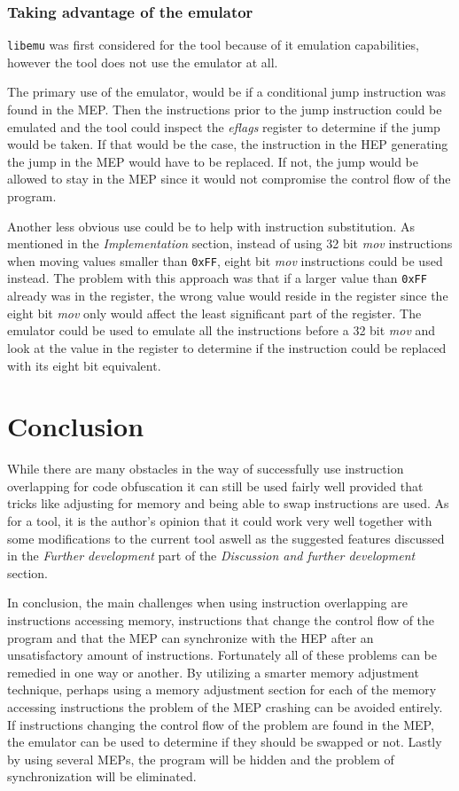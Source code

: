 \documentclass[11pt,twoside]{eitExjobb}
\begin{document}
\subsection{Taking advantage of the emulator}
\texttt{libemu} was first considered for the tool because of it emulation capabilities, however the tool does not use the emulator at all. 

The primary use of the emulator, would be if a conditional jump instruction was found in the MEP. Then the instructions prior to the jump instruction could be emulated and the tool could inspect the \emph{eflags} register to determine if the jump would be taken. If that would be the case, the instruction in the HEP generating the jump in the MEP would have to be replaced. If not, the jump would be allowed to stay in the MEP since it would not compromise the control flow of the program.

Another less obvious use could be to help with instruction substitution. As mentioned in the \emph{Implementation} section, instead of using 32 bit \emph{mov} instructions when moving values smaller than \texttt{0xFF}, eight bit \emph{mov} instructions could be used instead. The problem with this approach was that if a larger value than \texttt{0xFF} already was in the register, the wrong value would reside in the register since the eight bit \emph{mov} only would affect the least significant part of the register. The emulator could be used to emulate all the instructions before a 32 bit \emph{mov} and look at the value in the register to determine if the instruction could be replaced with its eight bit equivalent.

\chapter{Conclusion}
While there are many obstacles in the way of successfully use instruction overlapping for code obfuscation it can still be used fairly well provided that tricks like adjusting for memory and being able to swap instructions are used. As for a tool, it is the author's opinion that it could work very well together with some modifications to the current tool aswell as the suggested features discussed in the \emph{Further development} part of the \emph{Discussion and further development} section.

In conclusion, the main challenges when using instruction overlapping are instructions accessing memory, instructions that change the control flow of the program and that the MEP can synchronize with the HEP after an unsatisfactory amount of instructions. Fortunately all of these problems can be remedied in one way or another. By utilizing a smarter memory adjustment technique, perhaps using a memory adjustment section for each of the memory accessing instructions the problem of the MEP crashing can be avoided entirely. If instructions changing the control flow of the problem are found in the MEP, the emulator can be used to determine if they should be swapped or not. Lastly by using several MEPs, the program will be hidden and the problem of synchronization will be eliminated. 
\end{document}
